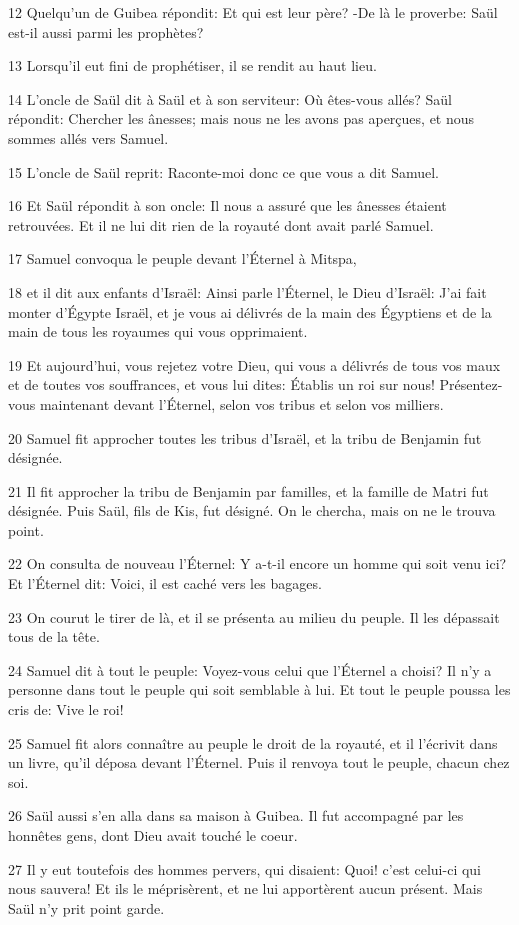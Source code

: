 \par 12 Quelqu'un de Guibea répondit: Et qui est leur père? -De là le proverbe: Saül est-il aussi parmi les prophètes?
\par 13 Lorsqu'il eut fini de prophétiser, il se rendit au haut lieu.
\par 14 L'oncle de Saül dit à Saül et à son serviteur: Où êtes-vous allés? Saül répondit: Chercher les ânesses; mais nous ne les avons pas aperçues, et nous sommes allés vers Samuel.
\par 15 L'oncle de Saül reprit: Raconte-moi donc ce que vous a dit Samuel.
\par 16 Et Saül répondit à son oncle: Il nous a assuré que les ânesses étaient retrouvées. Et il ne lui dit rien de la royauté dont avait parlé Samuel.
\par 17 Samuel convoqua le peuple devant l'Éternel à Mitspa,
\par 18 et il dit aux enfants d'Israël: Ainsi parle l'Éternel, le Dieu d'Israël: J'ai fait monter d'Égypte Israël, et je vous ai délivrés de la main des Égyptiens et de la main de tous les royaumes qui vous opprimaient.
\par 19 Et aujourd'hui, vous rejetez votre Dieu, qui vous a délivrés de tous vos maux et de toutes vos souffrances, et vous lui dites: Établis un roi sur nous! Présentez-vous maintenant devant l'Éternel, selon vos tribus et selon vos milliers.
\par 20 Samuel fit approcher toutes les tribus d'Israël, et la tribu de Benjamin fut désignée.
\par 21 Il fit approcher la tribu de Benjamin par familles, et la famille de Matri fut désignée. Puis Saül, fils de Kis, fut désigné. On le chercha, mais on ne le trouva point.
\par 22 On consulta de nouveau l'Éternel: Y a-t-il encore un homme qui soit venu ici? Et l'Éternel dit: Voici, il est caché vers les bagages.
\par 23 On courut le tirer de là, et il se présenta au milieu du peuple. Il les dépassait tous de la tête.
\par 24 Samuel dit à tout le peuple: Voyez-vous celui que l'Éternel a choisi? Il n'y a personne dans tout le peuple qui soit semblable à lui. Et tout le peuple poussa les cris de: Vive le roi!
\par 25 Samuel fit alors connaître au peuple le droit de la royauté, et il l'écrivit dans un livre, qu'il déposa devant l'Éternel. Puis il renvoya tout le peuple, chacun chez soi.
\par 26 Saül aussi s'en alla dans sa maison à Guibea. Il fut accompagné par les honnêtes gens, dont Dieu avait touché le coeur.
\par 27 Il y eut toutefois des hommes pervers, qui disaient: Quoi! c'est celui-ci qui nous sauvera! Et ils le méprisèrent, et ne lui apportèrent aucun présent. Mais Saül n'y prit point garde.

